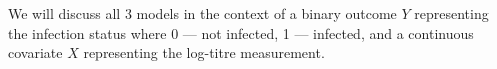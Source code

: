 We will discuss all 3 models in the context of a binary outcome $Y$ representing the infection status where 0 --- not infected, 1 --- infected, and a continuous covariate $X$ representing the log-titre measurement.
